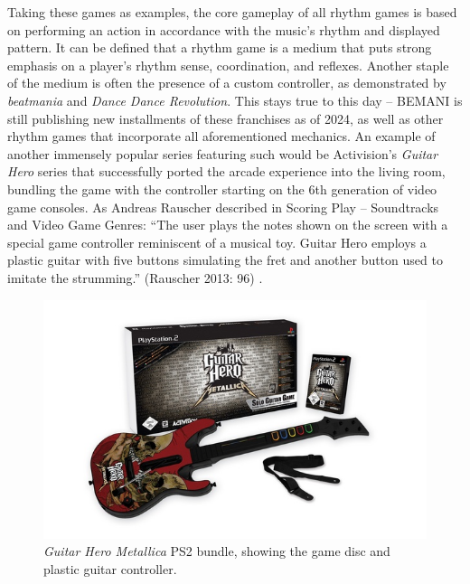 Taking these games as examples, the core gameplay of all rhythm games is based on performing an action in accordance with the music’s rhythm and displayed pattern. It can be defined that a rhythm game is a medium that puts strong emphasis on a player’s rhythm sense, coordination, and reflexes. Another staple of the medium is often the presence of a custom controller, as demonstrated by \textit{beatmania} and \textit{Dance Dance Revolution}. This stays true to this day -- BEMANI is still publishing new installments of these franchises as of 2024, as well as other rhythm games that incorporate all aforementioned mechanics. An example of another immensely popular series featuring such would be Activision’s \textit{Guitar Hero} series that successfully ported the arcade experience into the living room, bundling the game with the controller starting on the 6th generation of video game consoles. As Andreas Rauscher described in Scoring Play -- Soundtracks and Video Game Genres: ``The user plays the notes shown on the screen with a special game controller reminiscent of a musical toy. Guitar Hero employs a plastic guitar with five buttons simulating the fret and another button used to imitate the strumming.'' (Rauscher 2013: 96) \cite{MusicMedien}.

\begin{figure}[h]
    \centering\includegraphics[scale=0.55]{obrazki/gh2bundle.jpg}
    \caption{\textit{Guitar Hero Metallica} PS2 bundle, showing the game disc and plastic guitar controller. \cite{gh2bundle}}
    \label{fig:gh2_bundle}
\end{figure}

